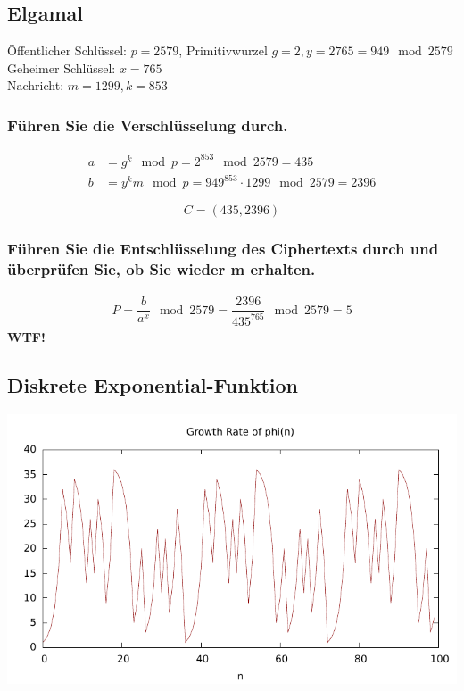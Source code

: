 \subsection{Elgamal}
Öffentlicher Schlüssel: $p = 2579$, Primitivwurzel $g = 2, y = 2765 = 949 \mod 2579$ \\
Geheimer Schlüssel: $x = 765$ \\
Nachricht: $m = 1299, k = 853$\\
\subsubsection{Führen Sie die Verschlüsselung durch.}

\begin{align}
	a&= g^k \mod p = 2^{853} \mod 2579 = 435 \\
	b&= y^km \mod p = 949^{853} \cdot 1299 \mod 2579 =2396
\end{align}

\[ C= (435,2396) \]

\subsubsection{Führen Sie die Entschlüsselung des Ciphertexts durch und überprüfen Sie, ob
Sie wieder m erhalten.}

\begin{align}
	P = \dfrac{b}{a^x} \mod 2579= \dfrac{2396}{435^{765}} \mod 2579 = 5 
\end{align}
\textbf{WTF!}

\subsection{Diskrete Exponential-Funktion}




\includegraphics[scale=1]{eclipse/expofun.pdf}


